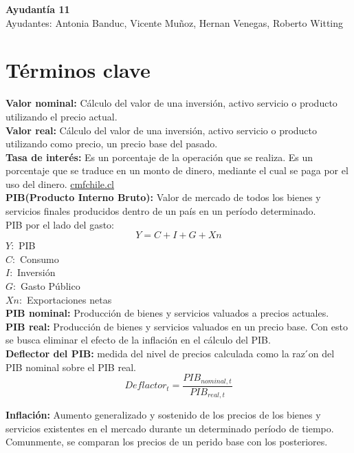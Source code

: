 \documentclass[11pt,letterpaper]{article}
\begin{document}
\begin{center}
    \textbf{\Large{Ayudantía 11}}\\
    Ayudantes: Antonia Banduc, Vicente Muñoz, Hernan Venegas, Roberto Witting
\end{center}

\section*{Términos clave}

\textbf{Valor nominal: } Cálculo del valor de una inversión, activo servicio o producto utilizando el precio actual.\\

\textbf{Valor real: } Cálculo del valor de una inversión, activo servicio o producto utilizando como precio, un precio base del pasado.\\

\textbf{Tasa de interés: } Es un porcentaje de la operación que se realiza. Es un porcentaje que se traduce en un monto de dinero, mediante el cual se paga por el uso del dinero. \url{cmfchile.cl}\\

\textbf{PIB(Producto Interno Bruto): }Valor de mercado de todos los bienes y servicios finales producidos dentro de un país en un período determinado.\\
PIB por el lado del gasto:\\
$$Y = C + I + G + Xn$$
$Y:$ PIB\\
$C:$ Consumo\\
$I:$ Inversión\\
$G:$ Gasto Público\\
$Xn:$ Exportaciones netas\\

\textbf{PIB nominal:} Producción de bienes y servicios valuados a precios actuales.\\ 

\textbf{PIB real:} Producción de bienes y servicios valuados en un precio base. Con esto se busca eliminar el efecto de la inflación en el cálculo del PIB.\\

\textbf{Deflector del PIB: } medida del nivel de precios calculada como la raz ́on del PIB
nominal sobre el PIB real.\\

$$Deflactor_t = \frac{PIB_{nominal,t}}{PIB_{real,t}}$$

\textbf{Inflación: } Aumento generalizado y sostenido de los precios de los bienes y servicios existentes en el mercado durante un determinado período de tiempo. Comunmente, se comparan los precios de un perido base con los posteriores.
\end{document}

